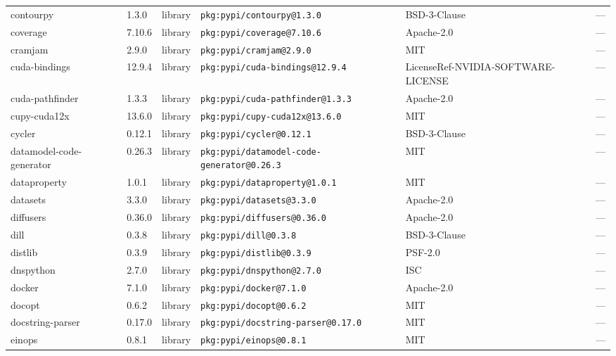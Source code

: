 \documentclass[11pt,a4paper]{article}
\begin{document}
\begin{longtable}{|p{4cm}|p{2cm}|p{1.6cm}|p{5cm}|p{1.5cm}|p{3.5cm}|}
\raggedright contourpy & 1.3.0 & library & \small\texttt{pkg:pypi/contourpy@1.3.0} & BSD-3-Clause & \small — \\
\raggedright coverage & 7.10.6 & library & \small\texttt{pkg:pypi/coverage@7.10.6} & Apache-2.0 & \small — \\
\raggedright cramjam & 2.9.0 & library & \small\texttt{pkg:pypi/cramjam@2.9.0} & MIT & \small — \\
\raggedright cuda-bindings & 12.9.4 & library & \small\texttt{pkg:pypi/cuda-bindings@12.9.4} & LicenseRef-NVIDIA-SOFTWARE-LICENSE & \small — \\
\raggedright cuda-pathfinder & 1.3.3 & library & \small\texttt{pkg:pypi/cuda-pathfinder@1.3.3} & Apache-2.0 & \small — \\
\raggedright cupy-cuda12x & 13.6.0 & library & \small\texttt{pkg:pypi/cupy-cuda12x@13.6.0} & MIT & \small — \\
\raggedright cycler & 0.12.1 & library & \small\texttt{pkg:pypi/cycler@0.12.1} & BSD-3-Clause & \small — \\
\raggedright datamodel-code-generator & 0.26.3 & library & \small\texttt{pkg:pypi/datamodel-code-generator@0.26.3} & MIT & \small — \\
\raggedright dataproperty & 1.0.1 & library & \small\texttt{pkg:pypi/dataproperty@1.0.1} & MIT & \small — \\
\raggedright datasets & 3.3.0 & library & \small\texttt{pkg:pypi/datasets@3.3.0} & Apache-2.0 & \small — \\
\raggedright diffusers & 0.36.0 & library & \small\texttt{pkg:pypi/diffusers@0.36.0} & Apache-2.0 & \small — \\
\raggedright dill & 0.3.8 & library & \small\texttt{pkg:pypi/dill@0.3.8} & BSD-3-Clause & \small — \\
\raggedright distlib & 0.3.9 & library & \small\texttt{pkg:pypi/distlib@0.3.9} & PSF-2.0 & \small — \\
\raggedright dnspython & 2.7.0 & library & \small\texttt{pkg:pypi/dnspython@2.7.0} & ISC & \small — \\
\raggedright docker & 7.1.0 & library & \small\texttt{pkg:pypi/docker@7.1.0} & Apache-2.0 & \small — \\
\raggedright docopt & 0.6.2 & library & \small\texttt{pkg:pypi/docopt@0.6.2} & MIT & \small — \\
\raggedright docstring-parser & 0.17.0 & library & \small\texttt{pkg:pypi/docstring-parser@0.17.0} & MIT & \small — \\
\raggedright einops & 0.8.1 & library & \small\texttt{pkg:pypi/einops@0.8.1} & MIT & \small — \\

\end{longtable}
\end{document}
